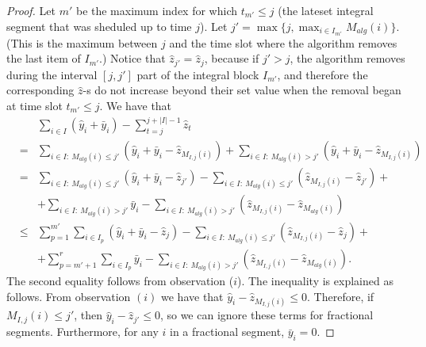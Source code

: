 \documentclass[12pt]{article}
\begin{document}
\begin{proof}
Let $m'$ be the maximum index for which $t_{m'}\le j$ 
(the lateset integral segment that was sheduled up to time $j$).
Let $j' = \max\{j,\max_{i\in I_{m'}} M_{alg}(i)\}$. (This is the
maximum between $j$ and the time slot where the algorithm 
removes the last item of $I_{m'}$.)  Notice that $\hat{z}_{j'} = \hat{z}_j$,
because if $j' > j$, the algorithm removes during the interval $[j,j']$
part of the integral block $I_{m'}$, and therefore the corresponding 
$\hat{z}$-s do not increase beyond their set value when the removal 
began at time slot $t_{m'}\le j$. 
We have that
\begin{eqnarray*}
& & \sum_{i\in I}(\hat{y}_i+\bar{y}_i) -\sum_{t=j}^{j+|I|-1}\hat{z}_t \\
& = & \sum_{i\in I:\ M_{alg}(i) \le j'} (\hat{y}_i+\bar{y}_i - \hat{z}_{M_{I,j}(i)}) +
\sum_{i\in I:\ M_{alg}(i) > j'} (\hat{y}_i+\bar{y}_i - \hat{z}_{M_{I,j}(i)}) \\
& = & \sum_{i\in I:\ M_{alg}(i) \le j'} (\hat{y}_i+\bar{y}_i - \hat{z}_{j'}) -
\sum_{i\in I:\ M_{alg}(i) \le j'} (\hat{z}_{M_{I,j}(i)} - \hat{z}_{j'}) + \\
& & + \sum_{i\in I:\ M_{alg}(i) > j'} \bar{y}_i - 
\sum_{i\in I:\ M_{alg}(i) > j'} (\hat{z}_{M_{I,j}(i)} - \hat{z}_{M_{alg}(i)}) \\
& \le & \sum_{p=1}^{m'}\sum_{i\in I_p} (\hat{y}_i+\bar{y}_i - \hat{z}_j) -
\sum_{i\in I:\ M_{alg}(i) \le j'} (\hat{z}_{M_{I,j}(i)} - \hat{z}_j) + \\
& & + \sum_{p=m'+1}^r \sum_{i\in I_p} \bar{y}_i - 
\sum_{i\in I:\ M_{alg}(i) > j'} (\hat{z}_{M_{I,j}(i)} - \hat{z}_{M_{alg}(i)}).
\end{eqnarray*}
The second equality follows from observation ($i$). The inequality is
explained as follows. From observation $(i)$ we have that
$\hat{y}_i - \hat{z}_{M_{I,j}(i)}\le 0$.
Therefore, if $M_{I,j}(i) \le j'$, then $\hat{y}_i - \hat{z}_{j'}\le 0$,
so we can ignore these terms for fractional segments. Furthermore,
for any $i$ in a fractional segment, $\bar{y}_i = 0$.


\end{proof}
\end{document}
